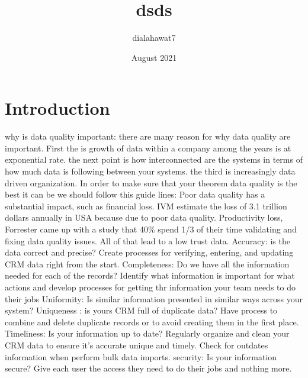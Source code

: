 \documentclass{article}
\title{dsds}
\author{dialahawat7 }
\date{August 2021}
\begin{document}
\maketitle

\section{Introduction}

why is data quality important:
there are many reason for why data quality are important. First the is growth of data within a company among the years is at exponential rate. the next point is how interconnected are the systems in terms of how much data is following between your systems. the third is increasingly data driven organization.
In order to make sure that your theorem data quality is the best it can be we should follow this guide lines:
Poor data quality has a substantial impact, such as financial loss. IVM estimate the loss of 3.1 trillion dollars annually  in USA because due to poor data quality. Productivity loss, Forrester came up with a study that 40\% spend 1/3 of their time validating and fixing data quality issues. All of that lead to a low trust data.
Accuracy: is the data correct and precise? Create processes for verifying, entering, and updating CRM data right from the start.
Completeness: Do we have all the information needed for each of the records? Identify what information is important for what actions and develop processes for getting thr information your team needs to do their jobs
Uniformity: Is similar information presented in similar ways across your system?
Uniqueness : is yours CRM full of duplicate data? Have process to combine and delete duplicate records or to avoid creating them in the first place.
Timeliness: Is your information up to date? Regularly organize and clean your CRM data to ensure it's accurate unique and timely. Check for outdates information when perform bulk data imports.
security: Is your information secure? Give each user the access they need to do their jobs and nothing more.
\end{document}

